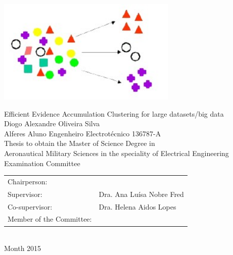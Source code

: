 \begin{center}
%
\vspace{2cm}
\includegraphics[height=50mm]{Figures/clustering.jpg}

\vspace{1.0cm}
{\FontLb Efficient Evidence Accumulation Clustering for large datasets/big data} \\
\vspace{2.7cm}
{\FontMb Diogo Alexandre Oliveira Silva} \\
{Alferes Aluno Engenheiro Electrotécnico 136787-A} \\
\vspace{2.0cm}
{\FontSn Thesis to obtain the Master of Science Degree in} \\
\vspace{0.3cm}
{\FontLb Aeronautical Military Sciences in the speciality of Electrical Engineering} \\
\vspace{1.1cm}
{\FontMb Examination Committee} \\
\vspace{0.3cm}
{\FontSn %
\begin{tabular}{ll}
Chairperson: &  \\
Supervisor: & Dra. Ana Luísa Nobre Fred \\
Co-supervisor: & Dra. Helena Aidos Lopes \\
Member of the Committee: & 
\end{tabular} } \\
\vspace{1.5cm}
{\FontMb Month 2015} \\
%
\end{center}

\cleardoublepage

